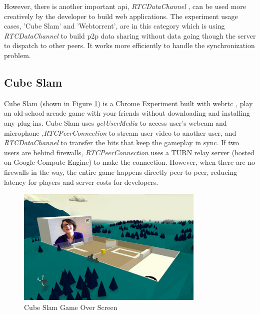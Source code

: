 \noindent However, there is another important \gls{api}, \textit{RTCDataChannel} , can be used more creatively by the developer to build web applications. The experiment  usage cases, 'Cube Slam' and 'Webtorrent', are in this category which is using \textit{RTCDataChannel} to build \gls{p2p} data sharing without data going though the server to dispatch to other peers. It works more efficiently to handle the synchronization problem.

\subsection{Cube Slam}

\par Cube Slam (shown in Figure \ref{fig:cube_slam}) is a Chrome Experiment built with \gls{webrtc} , play an old-school arcade game with your friends without downloading and installing any plug-ins. Cube Slam uses \textit{getUserMedia} to access user's webcam and microphone ,\textit{RTCPeerConnection} to stream user video to another user, and \textit{RTCDataChannel} to transfer the bits that keep the gameplay in sync. If two users are behind firewalls, \textit{RTCPeerConnection} uses a TURN  relay server (hosted on Google Compute Engine) to make the connection. However, when there are no firewalls in the way, the entire game happens directly peer-to-peer, reducing latency for players and server costs for developers.\cite{chrome:cube_slam}

\begin{figure}
	\centering
    	\includegraphics[width=0.8\textwidth,natwidth=610,natheight=642]{figs/cube_slam.jpg}
  	\caption{Cube Slam Game Over Screen}
  	\label{fig:cube_slam}
\end{figure}

